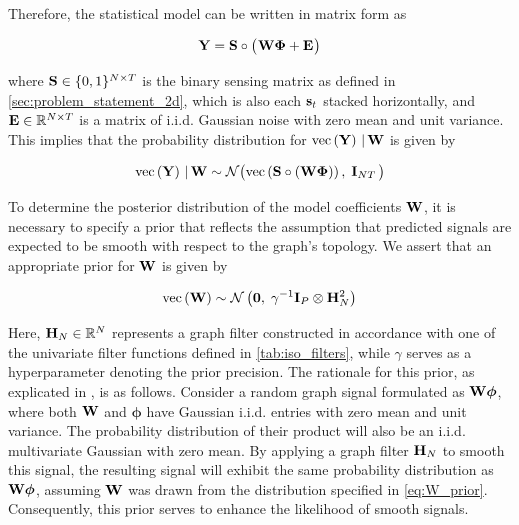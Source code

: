 Therefore, the statistical model can be written in matrix form as 


\begin{equation}
    \mathbf{Y} = \mathbf{S} \circ \big( \mspace{1mu} \mathbf{W} \mathbf{\Phi} + \mathbf{E} \mspace{1mu} \big)
\end{equation}

where $\mathbf{S} \in \{0, 1\}^{N \times T}$ is the binary sensing matrix as defined in \cref{sec:problem_statement_2d}, which is also each $\mathbf{s}_t$ stacked horizontally, and $\mathbf{E} \in \mathbb{R}^{N \times T}$ is a matrix of i.i.d. Gaussian noise with zero mean and unit variance. This implies that the probability distribution for $\text{\textup{vec}}\left(\mathbf{Y}\right) \, | \, \mathbf{W}$ is given by 

\begin{equation}
    \text{\textup{vec}}\left(\mathbf{Y}\right) \, | \, \mathbf{W} \sim \mathcal{N}\big( \text{\textup{vec}}\left(\mathbf{S} \circ (\mathbf{W} \mathbf{\Phi})\right), \; \mathbf{I}_{NT} \, \big)
\end{equation}

To determine the posterior distribution of the model coefficients $\mathbf{W}$, it is necessary to specify a prior that reflects the assumption that predicted signals are expected to be smooth with respect to the graph's topology. We assert that an appropriate prior for $\mathbf{W}$ is given by

\begin{equation}
\label{eq:W_prior}
\text{\textup{vec}}\left(\mathbf{W}\right) \sim \mathcal{N}\left(\mathbf{0}, \; \gamma^{-1} \mathbf{I}_P \otimes \mathbf{H}_N^{2}\right)
\end{equation}

Here, $\mathbf{H}_N \in \mathbb{R}^{N}$ represents a graph filter constructed in accordance with one of the univariate filter functions defined in \cref{tab:iso_filters}, while $\gamma$ serves as a hyperparameter denoting the prior precision. The rationale for this prior, as explicated in \cite{Venkitaraman2020}, is as follows. Consider a random graph signal formulated as $\mathbf{W} \boldsymbol{\phi}$, where both $\mathbf{W}$ and $\boldsymbol{\phi}$ have Gaussian i.i.d. entries with zero mean and unit variance. The probability distribution of their product will also be an i.i.d. multivariate Gaussian with zero mean. By applying a graph filter $\mathbf{H}_N$ to smooth this signal, the resulting signal will exhibit the same probability distribution as $\mathbf{W} \boldsymbol{\phi}$, assuming $\mathbf{W}$ was drawn from the distribution specified in \cref{eq:W_prior}. Consequently, this prior serves to enhance the likelihood of smooth signals.



